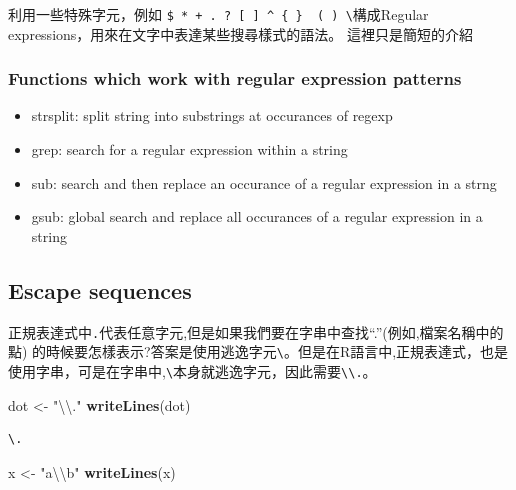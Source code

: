 \documentclass[]{book}
\newenvironment{Shaded}{\begin{snugshade}}{\end{snugshade}}
\newcommand{\CharTok}[1]{\textcolor[rgb]{0.31,0.60,0.02}{#1}}
\newcommand{\KeywordTok}[1]{\textcolor[rgb]{0.13,0.29,0.53}{\textbf{#1}}}
\newcommand{\NormalTok}[1]{#1}
\newcommand{\StringTok}[1]{\textcolor[rgb]{0.31,0.60,0.02}{#1}}
\providecommand{\tightlist}{%
  \setlength{\itemsep}{0pt}\setlength{\parskip}{0pt}}
\theoremstyle{definition}
\theoremstyle{definition}
\theoremstyle{definition}
\theoremstyle{remark}
\begin{document}
利用一些特殊字元，例如
\texttt{\$\ *\ +\ .\ ?\ {[}\ {]}\ \^{}\ \{\ \}\ \textbar{}\ (\ )\ \textbackslash{}}構成Regular
expressions，用來在文字中表達某些搜尋樣式的語法。 這裡只是簡短的介紹

\hypertarget{functions-which-work-with-regular-expression-patterns}{%
\subsubsection{Functions which work with regular expression
patterns}\label{functions-which-work-with-regular-expression-patterns}}

\begin{itemize}
\tightlist
\item
  strsplit: split string into substrings at occurances of regexp
\item
  grep: search for a regular expression within a string
\item
  sub: search and then replace an occurance of a regular expression in a
  strng
\item
  gsub: global search and replace all occurances of a regular expression
  in a string
\end{itemize}

\hypertarget{escape-sequences}{%
\subsection{Escape sequences}\label{escape-sequences}}

正規表達式中\texttt{.}代表任意字元,但是如果我們要在字串中查找``.''(例如,檔案名稱中的點)
的時候要怎樣表示?答案是使用逃逸字元\texttt{\textbackslash{}}。但是在R語言中,正規表達式，也是使用字串，可是在字串中,\texttt{\textbackslash{}}本身就逃逸字元，因此需要\texttt{\textbackslash{}\textbackslash{}.}。

\begin{Shaded}
\begin{Highlighting}[]
\NormalTok{dot <-}\StringTok{ "}\CharTok{\textbackslash{}\textbackslash{}}\StringTok{."}
\KeywordTok{writeLines}\NormalTok{(dot)}
\end{Highlighting}
\end{Shaded}

\begin{verbatim}
\.
\end{verbatim}

\begin{Shaded}
\begin{Highlighting}[]
\NormalTok{x <-}\StringTok{ "a}\CharTok{\textbackslash{}\textbackslash{}}\StringTok{b"}
\KeywordTok{writeLines}\NormalTok{(x)}
\end{Highlighting}
\end{Shaded}
\end{document}
